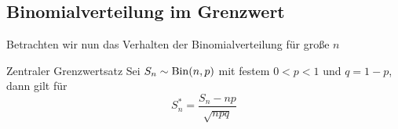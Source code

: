 \subsection{Binomialverteilung im Grenzwert}


Betrachten wir nun das Verhalten der Binomialverteilung für große $n$
\begin{satz}{Zentraler Grenzwertsatz}
	Sei $S_n\sim\operatorname{Bin}(n,p)$ mit festem $0<p<1$ und $q=1-p$, dann gilt für
	\begin{equation*}
		S_n^\ast =\frac{S_n-np}{\sqrt{npq}}
	\end{equation*}
\end{satz}
